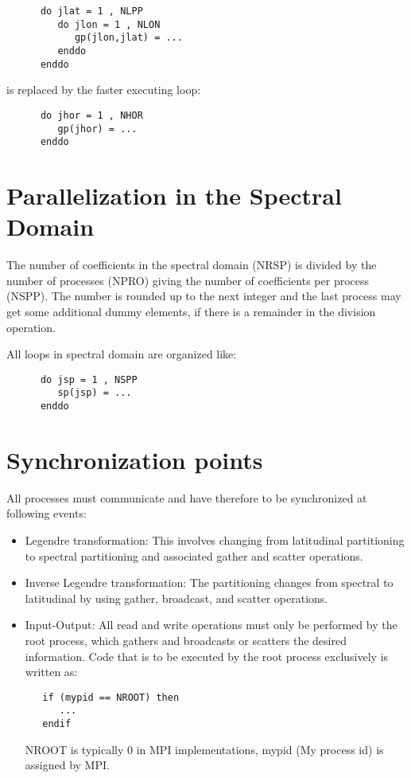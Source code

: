 \begin{verbatim}
      do jlat = 1 , NLPP
         do jlon = 1 , NLON
            gp(jlon,jlat) = ...
         enddo
      enddo
\end{verbatim}

is replaced by the faster executing loop:

\begin{verbatim}
      do jhor = 1 , NHOR
         gp(jhor) = ...
      enddo
\end{verbatim}

\section{Parallelization in the Spectral Domain}

The number of coefficients in the spectral domain (NRSP)
is divided by the number of processes (NPRO) giving
the number of coefficients per process (NSPP).
The number is rounded up to the next integer and the
last process may get some additional dummy elements,
if there is a remainder in the division operation.

All loops in spectral domain are organized like:

\begin{verbatim}
      do jsp = 1 , NSPP
         sp(jsp) = ...
      enddo
\end{verbatim}

\section{Synchronization points}

All processes must communicate and have therefore to
be synchronized at following events:

\begin{itemize}

\item Legendre transformation: 
This involves changing from latitudinal partitioning to
spectral partitioning and associated gather and scatter
operations.

\item Inverse Legendre transformation:
The partitioning changes from spectral to latitudinal
by using gather, broadcast, and scatter operations.

\item Input-Output:
All read and write operations must only be performed by
the root process, which gathers and broadcasts or
scatters the desired information.
Code that is to be executed by the root process exclusively is 
written as:

\begin{verbatim}
   if (mypid == NROOT) then
      ...
   endif
\end{verbatim}

NROOT is typically 0 in MPI implementations,
mypid (My process id) is assigned by MPI.

\end{itemize}


